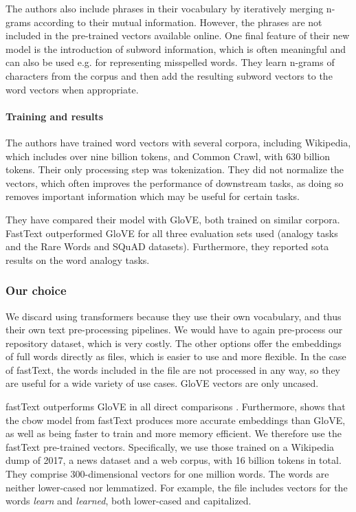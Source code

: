 The authors also include phrases in their vocabulary by iteratively merging n-grams according to their mutual information. However, the phrases are not included in the pre-trained vectors available online. One final feature of their new model is the introduction of subword information, which is often meaningful and can also be used e.g. for representing misspelled words. They learn n-grams of characters from the corpus and then add the resulting subword vectors to the word vectors when appropriate.

\paragraph{Training and results} \mbox{}

The authors have trained word vectors with several corpora, including Wikipedia, which includes over nine billion tokens, and Common Crawl, with 630 billion tokens. Their only processing step was tokenization. They did not normalize the vectors, which often improves the performance of downstream tasks, as doing so removes important information which may be useful for certain tasks.

They have compared their model with GloVE, both trained on similar corpora. FastText outperformed GloVE for all three evaluation sets used (analogy tasks and the Rare Words and SQuAD datasets). Furthermore, they reported \acrshort{sota} results on the word analogy tasks.

\subsubsection{Our choice}

We discard using transformers because they use their own vocabulary, and thus their own text pre-processing pipelines. We would have to again pre-process our repository dataset, which is very costly. The other options offer the embeddings of full words directly as files, which is easier to use and more flexible. In the case of fastText, the words included in the file are not processed in any way, so they are useful for a wide variety of use cases. GloVE vectors are only uncased.

fastText outperforms GloVE in all direct comparisons \cite{mikolov2017advances}. Furthermore, \cite{levy2015improving} shows that the \acrshort{cbow} model from fastText produces more accurate embeddings than GloVE, as well as being faster to train and more memory efficient. We therefore use the fastText pre-trained vectors. Specifically, we use those trained on a Wikipedia dump of 2017, a news dataset and a web corpus, with 16 billion tokens in total. They comprise 300-dimensional vectors for one million words. The words are neither lower-cased nor lemmatized. For example, the file includes vectors for the words \textit{learn} and \textit{learned}, both lower-cased and capitalized.
